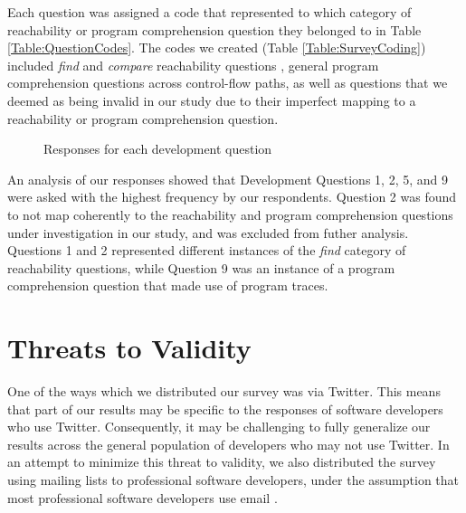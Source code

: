 \par Each question was assigned a code that represented to which category of
reachability or program comprehension question they belonged to in
Table \ref{Table:QuestionCodes}.
The codes we created (Table \ref{Table:SurveyCoding}) included \textit{find} 
and \textit{compare} reachability questions \cite{latoza-2010-reach}, general 
program comprehension questions across control-flow paths, as well as questions 
that we deemed as being invalid in our study due to their imperfect mapping to 
a reachability or program comprehension question. 



\begin{figure}[ht]
\centering
\caption{Responses for each development question}

\label{fig:SurveyResults}
\end{figure}

\par An analysis of our responses showed that Development Questions 1, 2, 5,
and 9 were asked with the highest frequency by our respondents.
Question 2 was found to not map coherently to the reachability and program
comprehension questions under investigation in our study, and was excluded
from futher analysis.
Questions 1 and 2 represented different instances of the \textit{find} category 
of reachability questions, while Question 9 was an instance of a program
comprehension question that made use of program traces.



\section{Threats to Validity}
\label{sec:ThreatsToValidity}


\noindent One of the ways which we distributed our survey was via Twitter.  
This means that part of our results may be specific to the responses of
software developers who use Twitter.
Consequently, it may be challenging to fully generalize our results across
the general population of developers who may not use Twitter.
In an attempt to minimize this threat to validity, we also distributed the 
survey using mailing lists to professional software developers, under the
assumption that most professional software developers use email
\cite{gousios-2016-work-practices}.

